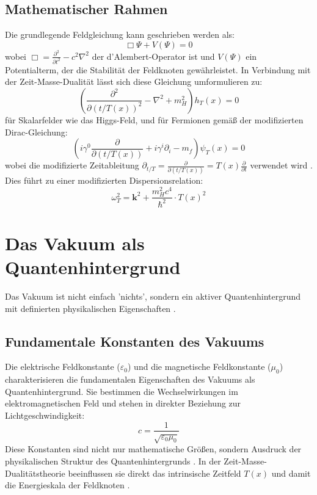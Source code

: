 \documentclass[12pt,a4paper]{article}
\begin{document}
	\subsection{Mathematischer Rahmen}
	Die grundlegende Feldgleichung kann geschrieben werden als:
	\begin{equation}
		\Box \Psi + V(\Psi) = 0
	\end{equation}
	wobei \(\Box = \frac{\partial^2}{\partial t^2} - c^2 \nabla^2\) der d'Alembert-Operator ist und \(V(\Psi)\) ein Potentialterm, der die Stabilität der Feldknoten gewährleistet. In Verbindung mit der Zeit-Masse-Dualität lässt sich diese Gleichung umformulieren zu:
	\begin{equation}
		\left(\frac{\partial^2}{\partial(t/T(x))^2} - \nabla^2 + m_H^2\right) h_T(x) = 0
	\end{equation}
	für Skalarfelder wie das Higgs-Feld, und für Fermionen gemäß der modifizierten Dirac-Gleichung:
	\begin{equation}
		\left(i\gamma^0\frac{\partial}{\partial(t/T(x))} + i\gamma^i\partial_i - m_f\right) \psi_T(x) = 0
	\end{equation}
	wobei die modifizierte Zeitableitung \(\partial_{t/T} = \frac{\partial}{\partial(t/T(x))} = T(x)\frac{\partial}{\partial t}\) verwendet wird \cite{Pascher2024}. Dies führt zu einer modifizierten Dispersionsrelation:
	\begin{equation}
		\omega_T^2 = \mathbf{k}^2 + \frac{m_H^2 c^4}{\hbar^2} \cdot T(x)^2
	\end{equation}
	
	\section{Das Vakuum als Quantenhintergrund}
	Das Vakuum ist nicht einfach 'nichts', sondern ein aktiver Quantenhintergrund mit definierten physikalischen Eigenschaften \cite{Milonni1994}.
	
	\subsection{Fundamentale Konstanten des Vakuums}
	Die elektrische Feldkonstante (\(\varepsilon_0\)) und die magnetische Feldkonstante (\(\mu_0\)) charakterisieren die fundamentalen Eigenschaften des Vakuums als Quantenhintergrund. Sie bestimmen die Wechselwirkungen im elektromagnetischen Feld und stehen in direkter Beziehung zur Lichtgeschwindigkeit:
	\begin{equation}
		c = \frac{1}{\sqrt{\varepsilon_0 \mu_0}}
	\end{equation}
	Diese Konstanten sind nicht nur mathematische Größen, sondern Ausdruck der physikalischen Struktur des Quantenhintergrunds \cite{Aitchison2004}. In der Zeit-Masse-Dualitätstheorie beeinflussen sie direkt das intrinsische Zeitfeld \(T(x)\) und damit die Energieskala der Feldknoten \cite{Pascher2024}.
	
\end{document}
